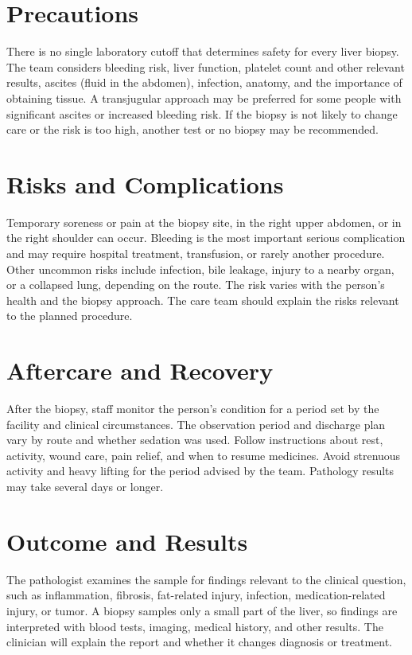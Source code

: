 \section*{Precautions}
There is no single laboratory cutoff that determines safety for every liver biopsy. The team considers bleeding risk, liver function, platelet count and other relevant results, ascites (fluid in the abdomen), infection, anatomy, and the importance of obtaining tissue. A transjugular approach may be preferred for some people with significant ascites or increased bleeding risk. If the biopsy is not likely to change care or the risk is too high, another test or no biopsy may be recommended.

\section*{Risks and Complications}
Temporary soreness or pain at the biopsy site, in the right upper abdomen, or in the right shoulder can occur. Bleeding is the most important serious complication and may require hospital treatment, transfusion, or rarely another procedure. Other uncommon risks include infection, bile leakage, injury to a nearby organ, or a collapsed lung, depending on the route. The risk varies with the person's health and the biopsy approach. The care team should explain the risks relevant to the planned procedure.

\section*{Aftercare and Recovery}
After the biopsy, staff monitor the person's condition for a period set by the facility and clinical circumstances. The observation period and discharge plan vary by route and whether sedation was used. Follow instructions about rest, activity, wound care, pain relief, and when to resume medicines. Avoid strenuous activity and heavy lifting for the period advised by the team. Pathology results may take several days or longer.

\section*{Outcome and Results}
The pathologist examines the sample for findings relevant to the clinical question, such as inflammation, fibrosis, fat-related injury, infection, medication-related injury, or tumor. A biopsy samples only a small part of the liver, so findings are interpreted with blood tests, imaging, medical history, and other results. The clinician will explain the report and whether it changes diagnosis or treatment.

